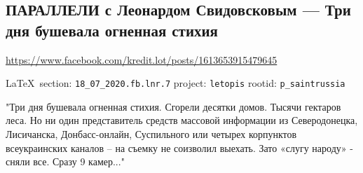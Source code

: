  
 
  
\subsection{ПАРАЛЛЕЛИ с Леонардом Свидовсковым --- Три дня бушевала огненная стихия}
\url{https://www.facebook.com/kredit.lot/posts/1613653915479645}

\vspace{0.5cm}
{\small\LaTeX~section: \verb|18_07_2020.fb.lnr.7| project: \verb|letopis| rootid: \verb|p_saintrussia|}
\vspace{0.5cm}

"Три дня бушевала огненная стихия. Сгорели десятки домов. Тысячи гектаров леса.
Но ни один представитель средств массовой информации из Северодонецка,
Лисичанска, Донбасс-онлайн, Суспильного или четырех корпунктов всеукраинских
каналов – на съемку не соизволил выехать. Зато «слугу народу» - сняли все.
Сразу 9 камер..."
